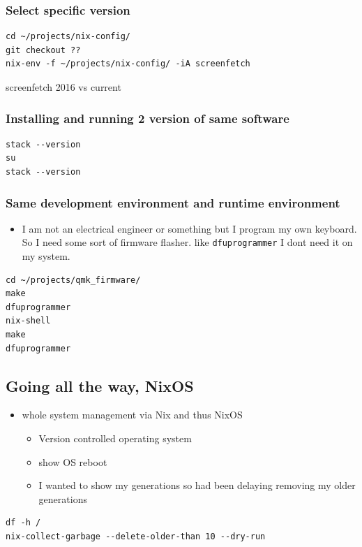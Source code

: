 \documentclass[11pt]{article}
\begin{document}
\subsubsection{Select specific version}
\label{sec:org32c4c51}
\begin{verbatim}
cd ~/projects/nix-config/
git checkout ??
nix-env -f ~/projects/nix-config/ -iA screenfetch
\end{verbatim}
screenfetch 2016 vs current
\subsubsection{Installing and running 2 version of same software}
\label{sec:org771e780}
\begin{verbatim}
stack --version
su
stack --version
\end{verbatim}
\subsubsection{Same development environment and runtime environment}
\label{sec:orgd483a19}
\begin{itemize}
\item I am not an electrical engineer or something but I program my
own keyboard. So I need some sort of firmware flasher. like
\texttt{dfuprogrammer} I dont need it on my system.
\end{itemize}
\begin{verbatim}
cd ~/projects/qmk_firmware/
make
dfuprogrammer
nix-shell
make
dfuprogrammer
\end{verbatim}
\subsection{Going all the way, NixOS}
\label{sec:orga0110e3}
\begin{itemize}
\item whole system management via Nix and thus NixOS
\begin{itemize}
\item Version controlled operating system
\item show OS reboot
\item I wanted to show my generations so had been delaying removing
my older generations
\end{itemize}
\end{itemize}
\begin{verbatim}
df -h /
nix-collect-garbage --delete-older-than 10 --dry-run
\end{verbatim}
\end{document}
